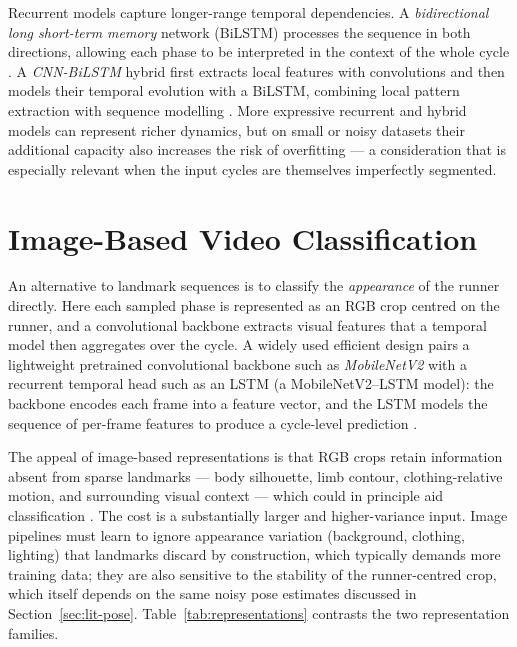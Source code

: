 Recurrent models capture longer-range temporal dependencies. A
\emph{bidirectional long short-term memory} network (BiLSTM) processes the
sequence in both directions, allowing each phase to be interpreted in the
context of the whole cycle \cite{hochreiter1997lstm, schuster1997bidirectional}.
A \emph{CNN-BiLSTM} hybrid first extracts local features with convolutions and
then models their temporal evolution with a BiLSTM, combining local pattern
extraction with sequence modelling \cite{donahue2015lrcn}. More expressive
recurrent and hybrid models can represent richer dynamics, but on small or noisy
datasets their additional capacity also increases the risk of overfitting --- a
consideration that is especially relevant when the input cycles are themselves
imperfectly segmented.

\section{Image-Based Video Classification}
\label{sec:lit-image}

An alternative to landmark sequences is to classify the \emph{appearance} of the
runner directly. Here each sampled phase is represented as an RGB crop centred
on the runner, and a convolutional backbone extracts visual features that a
temporal model then aggregates over the cycle. A widely used efficient design
pairs a lightweight pretrained convolutional backbone such as
\emph{MobileNetV2} with a recurrent temporal head such as an LSTM
(a MobileNetV2--LSTM model): the backbone encodes each frame into a feature
vector, and the LSTM models the sequence of per-frame features to produce a
cycle-level prediction \cite{sandler2018mobilenetv2, donahue2015lrcn}.

The appeal of image-based representations is that RGB crops retain information
absent from sparse landmarks --- body silhouette, limb contour, clothing-relative
motion, and surrounding visual context --- which could in principle aid
classification \cite{topham2023hpesurvey}. The cost is a substantially larger and
higher-variance input. Image pipelines must learn to ignore appearance variation
(background, clothing, lighting) that landmarks discard by construction, which
typically demands more training data; they are also sensitive to the stability
of the runner-centred crop, which itself depends on the same noisy pose estimates
discussed in Section~\ref{sec:lit-pose}.
Table~\ref{tab:representations} contrasts the two representation families.

